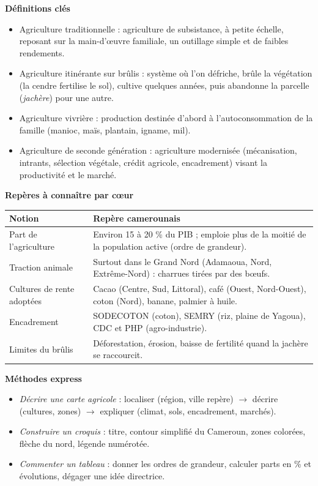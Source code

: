 \documentclass[11pt]{article}
\newcommand{\cle}[1]{{\popxbold\color{popdark}#1}}
\begin{document}
\begin{bilan}
\textbf{Définitions clés}
\begin{itemize}
  \item \cle{Agriculture traditionnelle} : agriculture de subsistance, à petite échelle, reposant sur la main-d'œuvre familiale, un outillage simple et de faibles rendements.
  \item \cle{Agriculture itinérante sur brûlis} : système où l'on défriche, brûle la végétation (la cendre fertilise le sol), cultive quelques années, puis abandonne la parcelle (\emph{jachère}) pour une autre.
  \item \cle{Agriculture vivrière} : production destinée d'abord à l'autoconsommation de la famille (manioc, maïs, plantain, igname, mil).
  \item \cle{Agriculture de seconde génération} : agriculture modernisée (mécanisation, intrants, sélection végétale, crédit agricole, encadrement) visant la productivité et le marché.
\end{itemize}

\textbf{Repères à connaître par cœur}
\begin{center}
\begin{tabularx}{\linewidth}{|l|X|}\hline
\rowcolor{popblueL} \textbf{Notion} & \textbf{Repère camerounais} \\ \hline
Part de l'agriculture & Environ 15 à 20 \% du PIB ; emploie plus de la moitié de la population active (ordre de grandeur). \\ \hline
Traction animale & Surtout dans le Grand Nord (Adamaoua, Nord, Extrême-Nord) : charrues tirées par des bœufs. \\ \hline
Cultures de rente adoptées & Cacao (Centre, Sud, Littoral), café (Ouest, Nord-Ouest), coton (Nord), banane, palmier à huile. \\ \hline
Encadrement & SODECOTON (coton), SEMRY (riz, plaine de Yagoua), CDC et PHP (agro-industrie). \\ \hline
Limites du brûlis & Déforestation, érosion, baisse de fertilité quand la jachère se raccourcit. \\ \hline
\end{tabularx}
\end{center}

\textbf{Méthodes express}
\begin{itemize}
  \item \emph{Décrire une carte agricole} : localiser (région, ville repère) $\rightarrow$ décrire (cultures, zones) $\rightarrow$ expliquer (climat, sols, encadrement, marchés).
  \item \emph{Construire un croquis} : titre, contour simplifié du Cameroun, zones colorées, flèche du nord, légende numérotée.
  \item \emph{Commenter un tableau} : donner les ordres de grandeur, calculer parts en \% et évolutions, dégager une idée directrice.
\end{itemize}
\end{bilan}
\end{document}
